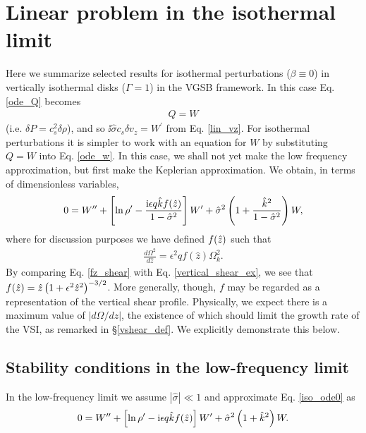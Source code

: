 \section{Linear problem in the isothermal limit}\label{iso_discuss}  
Here we summarize selected results for isothermal
perturbations ($\beta\equiv 0$) in vertically isothermal disks 
($\Gamma=1$) in the VGSB framework. In this case Eq. \ref{ode_Q}
becomes    
\begin{align} 
  Q = W 
\end{align}
(i.e. $\delta P = c_s^2\delta \rho$), and so $  \ii\hat{\sigma}c_s\delta v_z = W^\prime $
from Eq. \ref{lin_vz}. For isothermal perturbations it is 
simpler to work with an equation for $W$ by substituting $Q=W$ into
Eq. \ref{ode_w}. In this case, we shall not yet make the low frequency
approximation, but first make the  Keplerian approximation. We
obtain, in terms of dimensionless variables, 
\begin{align}
  0 = W^{\prime\prime} + \left[\ln\rho^\prime - \frac{\mathrm{i} \epsilon q \hat{k} f(\hat{z})
      }{1-\hat{\sigma}^2} \right]W^\prime +
  \hat{\sigma}^2\left(1+\frac{\hat{k}^2}{1-\hat{\sigma}^2}\right)W,\label{iso_ode0} 
\end{align}
where for discussion purposes we have defined $f(\hat{z})$ such that
\begin{align}\label{fz_shear}
  \frac{d\Omega^2}{d\hat{z}} = \epsilon^2q f(\hat{z})\Omega_k^2.
\end{align}
By comparing Eq. \ref{fz_shear} with Eq. \ref{vertical_shear_ex}, we
see that $f(\hat{z})= 
\hat{z}\left(1+\epsilon^2\hat{z}^2\right)^{-3/2}$. More generally, though,
$f$ may be regarded as a representation of the vertical
shear profile. Physically, we expect there is a maximum value of 
$|d\Omega/dz|$, the existence of which should limit the growth rate of
the VSI,  as remarked in \S\ref{vshear_def}. We explicitly demonstrate
this below.     

\subsection{Stability conditions in the low-frequency limit}
In the low-frequency limit we assume $|\hat{\sigma}|\ll 1$ and
approximate Eq. \ref{iso_ode0} as 
\begin{align}
  0 = W^{\prime\prime} + \left[\ln\rho^\prime - \mathrm{i} \epsilon q \hat{k}
    f(\hat{z})\right]W^\prime +
  \hat{\sigma}^2\left(1+\hat{k}^2\right)W. \label{iso_ode1}
\end{align}
